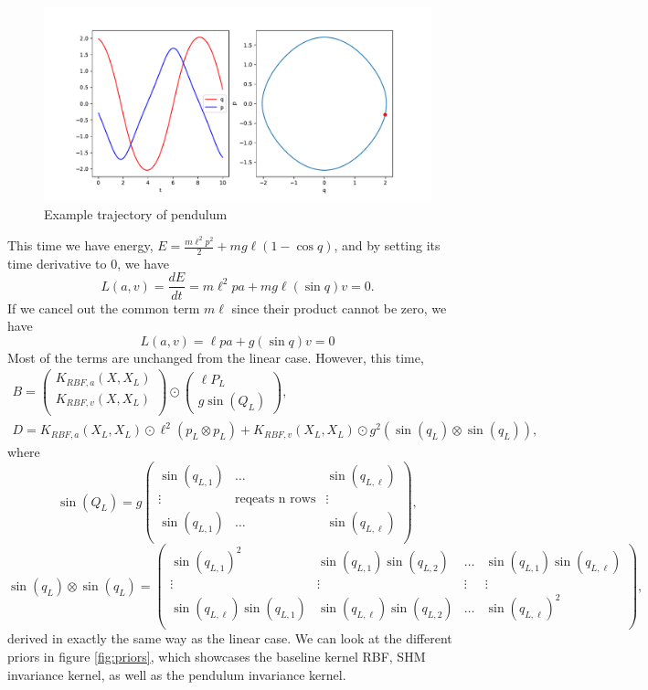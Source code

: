 \documentclass{statsmsc}
\begin{document}
\begin{figure}[H] 
  \includegraphics[width=0.7\linewidth]{../codes/figures/pendulum_trajectory_1D.pdf}
  \centering
  \caption{Example trajectory of pendulum}
  \label{fig:pendulum_trajectory}
\end{figure}

This time we have energy, $E=\frac{m\ell^2p^2}{2}+mg\ell(1-\cos q)$, and by setting its time derivative to 0, we have 
$$L(a, v)=\frac{dE}{dt}=m\ell^2pa+mg\ell(\sin q)v=0.$$
If we cancel out the common term $m\ell$ since their product cannot be zero, we have $$L(a,v)=\ell pa+g(\sin q)v=0$$
Most of the terms are unchanged from the linear case. 
However, this time, 
$$
\begin{gathered}
B=\begin{pmatrix}
    K_{RBF,a}(X, X_L) \\ K_{RBF,v}(X, X_L) \\
\end{pmatrix}\odot \begin{pmatrix}
    \ell P_L \\ g\sin(Q_L)
\end{pmatrix},\\ D=K_{RBF,a}(X_L, X_L)\odot \ell^2(p_L\otimes p_L) + K_{RBF,v}(X_L, X_L)\odot g^2(\sin(q_L)\otimes \sin(q_L)),
\end{gathered}
$$
where 
$$
\sin(Q_L) = g\begin{pmatrix}
  \sin(q_{L,1})  & \dots & \sin(q_{L,\ell})  \\
  \vdots & \text{reqeats n rows} &  \vdots\\
  \sin(q_{L,1})  & \dots & \sin(q_{L,\ell})  \\
\end{pmatrix},
$$
$$
\sin(q_L)\otimes \sin(q_L)=\begin{pmatrix}
  \sin(q_{L,1})^2 & \sin(q_{L,1})\sin(q_{L,2}) & \dots & \sin(q_{L,1})\sin(q_{L,\ell}) \\
  \vdots & \vdots & \vdots & \vdots \\
  \sin(q_{L,\ell})\sin(q_{L,1}) & \sin(q_{L,\ell})\sin(q_{L,2}) & \dots & \sin(q_{L,\ell})^2 \\
\end{pmatrix},
$$
derived in exactly the same way as the linear case. 
We can look at the different priors in figure \ref{fig:priors}, which showcases the baseline kernel RBF, SHM invariance kernel, as well as the pendulum invariance kernel.
\end{document}
